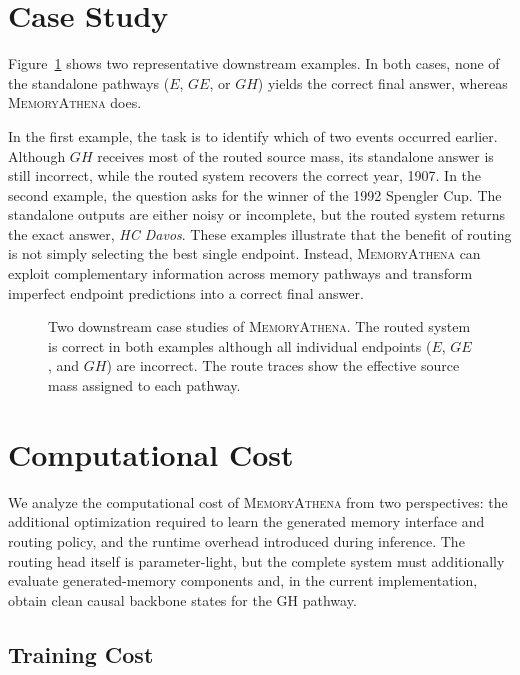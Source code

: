 \section{Case Study}
\label{sec:case-study}

Figure~\ref{fig:case-study} shows two representative downstream examples.
In both cases, none of the standalone pathways ($E$, $GE$, or $GH$) yields the
correct final answer, whereas \textsc{MemoryAthena} does.

In the first example, the task is to identify which of two events occurred
earlier.
Although $GH$ receives most of the routed source mass, its standalone answer is
still incorrect, while the routed system recovers the correct year, 1907.
In the second example, the question asks for the winner of the 1992 Spengler
Cup.
The standalone outputs are either noisy or incomplete, but the routed system
returns the exact answer, \textit{HC Davos}.
These examples illustrate that the benefit of routing is not simply selecting
the best single endpoint.
Instead, \textsc{MemoryAthena} can exploit complementary information across
memory pathways and transform imperfect endpoint predictions into a correct
final answer.

\begin{figure}[t]
    \centering
    \caption{
    Two downstream case studies of \textsc{MemoryAthena}.
    The routed system is correct in both examples although all individual
    endpoints ($E$, $GE$, and $GH$) are incorrect.
    The route traces show the effective source mass assigned to each pathway.
    }
    \label{fig:case-study}
\end{figure}


\section{Computational Cost}
\label{app:compute}

We analyze the computational cost of \textsc{MemoryAthena} from two
perspectives: the additional optimization required to learn the generated
memory interface and routing policy, and the runtime overhead introduced during
inference. The routing head itself is parameter-light, but the complete system
must additionally evaluate generated-memory components and, in the current
implementation, obtain clean causal backbone states for the GH pathway.

\subsection{Training Cost}


